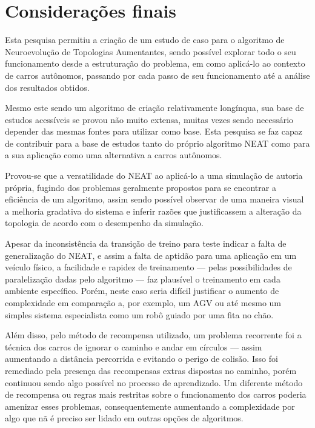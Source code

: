 \chapter{Considerações finais}

Esta pesquisa permitiu a criação de um estudo de caso para o algoritmo de Neuroevolução de Topologias Aumentantes, 
sendo possível explorar todo o seu funcionamento desde a estruturação do problema, em como aplicá-lo ao contexto de 
carros autônomos, passando por cada passo de seu funcionamento até a análise dos resultados obtidos.

Mesmo este sendo um algoritmo de criação relativamente longínqua, sua base de estudos acessíveis se provou não 
muito extensa, muitas vezes sendo necessário depender das mesmas fontes para utilizar como base. Esta pesquisa se 
faz capaz de contribuir para a base de estudos tanto do próprio algoritmo NEAT como para a sua aplicação como uma 
alternativa a carros autônomos.

Provou-se que a versatilidade do NEAT ao aplicá-lo a uma simulação de autoria própria, fugindo dos problemas geralmente 
propostos para se encontrar a eficiência de um algoritmo, assim sendo possível observar de uma maneira visual a melhoria 
gradativa do sistema e inferir razões que justificassem a alteração da topologia de acordo com o desempenho da simulação.

Apesar da inconsist{\^e}ncia da transi{\c
c}{\~a}o de treino para teste indicar a falta de
generaliza{\c c}{\~a}o do NEAT, e assim a falta
de aptid{\~a}o para uma aplica{\c c}{\~a}o em um
ve{\'i}culo f{\'i}sico, a facilidade e rapidez
de treinamento — pelas possibilidades de
paraleliza{\c c}{\~a}o dadas pelo algoritmo — faz
plaus{\'i}vel o treinamento em cada
ambiente espec{\'i}fico. Por{\'e}m, neste caso
seria dif{\'i}cil justificar o aumento de
complexidade em compara{\c c}{\~a}o a, por
exemplo, um AGV ou at{\'e} mesmo um simples
sistema especialista como um rob{\^o} guiado
por uma fita no ch{\~a}o.

Al{\'e}m disso, pelo método de recompensa utilizado, 
um problema recorrente foi a t{\'e}cnica dos carros de 
ignorar o caminho e andar em c{\'i}rculos — assim aumentando 
a dist{\^a}ncia percorrida e evitando o perigo de colis{\~a}o. 
Isso foi remediado pela presen{\c c}a das recompensas extras 
dispostas no caminho, por{\'e}m continuou sendo algo poss{\'i}vel no 
processo de aprendizado. Um diferente m{\'e}todo de recompensa ou 
regras mais restritas sobre o funcionamento dos carros poderia 
amenizar esses problemas, consequentemente aumentando a complexidade 
por algo que n{\~a} {\'e} preciso ser lidado em outras op{\c c}{\~o}es de algoritmos.

